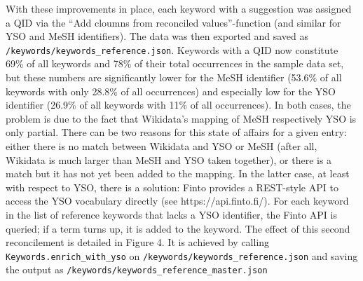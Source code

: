 With these improvements in place, each keyword with a suggestion was
assigned a QID via the ``Add cloumns from reconciled values''-function
(and similar for YSO and MeSH identifiers). The data was then exported
and saved as \texttt{/keywords/keywords\_reference.json}. Keywords with
a QID now constitute 69\% of all keywords and 78\% of their total
occurrences in the sample data set, but these numbers are significantly
lower for the MeSH identifier (53.6\% of all keywords with only 28.8\%
of all occurrences) and especially low for the YSO identifier (26.9\% of
all keywords with 11\% of all occurrences). In both cases, the problem
is due to the fact that Wikidata's mapping of MeSH respectively YSO is
only partial. There can be two reasons for this state of affairs for a
given entry: either there is no match between Wikidata and YSO or MeSH
(after all, Wikidata is much larger than MeSH and YSO taken together),
or there is a match but it has not yet been added to the mapping. In the
latter case, at least with respect to YSO, there is a solution: Finto
provides a REST-style API to access the YSO vocabulary directly (see
https://api.finto.fi/). For each keyword in the list of reference
keywords that lacks a YSO identifier, the Finto API is queried; if a
term turns up, it is added to the keyword. The effect of this second
reconcilement is detailed in Figure 4. It is achieved by calling
\texttt{Keywords.enrich\_with\_yso} on
\texttt{/keywords/keywords\_reference.json} and saving the output as
\texttt{/keywords/keywords\_reference\_master.json}

\begin{Shaded}
\begin{Highlighting}[]
\OperatorTok{=}\OperatorTok{+} \NormalTok{)}
\OperatorTok{=}
\OperatorTok{+} \NormalTok{)}
\end{Highlighting}
\end{Shaded}

